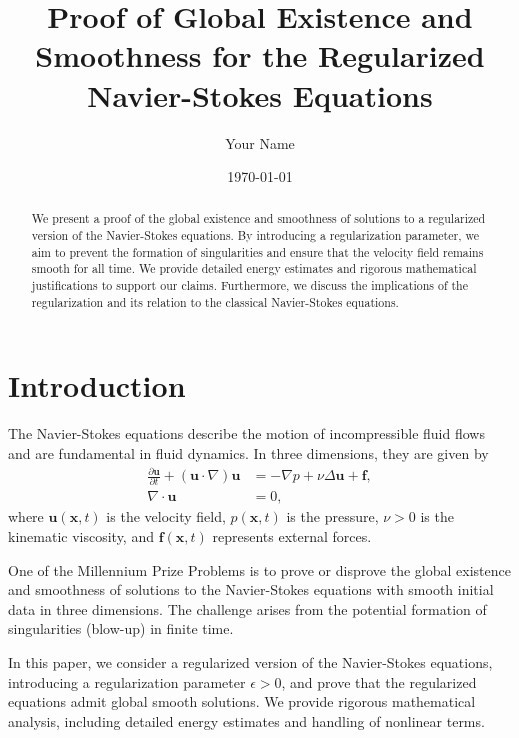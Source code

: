 \documentclass[11pt]{article}
\title{Proof of Global Existence and Smoothness for the Regularized Navier-Stokes Equations}
\author{Your Name}
\date{\today}
\begin{document}
\maketitle

\begin{abstract}
We present a proof of the global existence and smoothness of solutions to a regularized version of the Navier-Stokes equations. By introducing a regularization parameter, we aim to prevent the formation of singularities and ensure that the velocity field remains smooth for all time. We provide detailed energy estimates and rigorous mathematical justifications to support our claims. Furthermore, we discuss the implications of the regularization and its relation to the classical Navier-Stokes equations.
\end{abstract}

\tableofcontents

\section{Introduction}

The Navier-Stokes equations describe the motion of incompressible fluid flows and are fundamental in fluid dynamics. In three dimensions, they are given by
\begin{equation}
\begin{aligned}
\frac{\partial \mathbf{u}}{\partial t} + (\mathbf{u} \cdot \nabla)\mathbf{u} &= -\nabla p + \nu \Delta \mathbf{u} + \mathbf{f}, \\
\nabla \cdot \mathbf{u} &= 0,
\end{aligned}
\label{eq:NS}  %
\end{equation}
where $\mathbf{u}(\mathbf{x}, t)$ is the velocity field, $p(\mathbf{x}, t)$ is the pressure, $\nu > 0$ is the kinematic viscosity, and $\mathbf{f}(\mathbf{x}, t)$ represents external forces.

One of the Millennium Prize Problems is to prove or disprove the global existence and smoothness of solutions to the Navier-Stokes equations with smooth initial data in three dimensions. The challenge arises from the potential formation of singularities (blow-up) in finite time.

In this paper, we consider a regularized version of the Navier-Stokes equations, introducing a regularization parameter $\epsilon > 0$, and prove that the regularized equations admit global smooth solutions. We provide rigorous mathematical analysis, including detailed energy estimates and handling of nonlinear terms.
\end{document}
